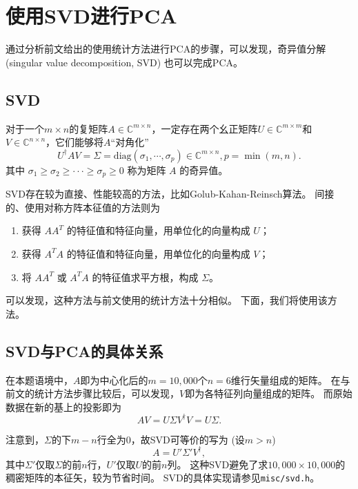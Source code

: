 \section{使用SVD进行PCA}
通过分析前文给出的使用统计方法进行PCA的步骤，可以发现，奇异值分解 (singular value decomposition, SVD) 也可以完成PCA。

\subsection{SVD}
对于一个$m \times n$的复矩阵$A \in \mathbb{C}^{m\times n}$，一定存在两个幺正矩阵$U \in \mathbb{C}^{m\times m}$和
$V \in \mathbb{C}^{n\times n}$，它们能够将$A$“对角化”
\begin{equation}
    U^\dagger AV = Σ = \mathrm{diag}(\sigma_1 ,\cdots,\sigma_p ) \in \mathbb{C}^{m\times n} , p = \min(m,n).
\end{equation}
其中 $\sigma_1 \ge \sigma_2 \ge ··· \ge \sigma_p \ge 0$ 称为矩阵 $A$ 的奇异值。

SVD存在较为直接、性能较高的方法，比如Golub-Kahan-Reinsch算法。
间接的、使用对称方阵本征值的方法则为
\begin{enumerate}
    \item 获得 $AA^T$ 的特征值和特征向量，用单位化的向量构成 $U$；
    \item 获得 $A^T A$ 的特征值和特征向量，用单位化的向量构成 $V$；
    \item 将 $AA^T$ 或 $A^T A$ 的特征值求平方根，构成 $\Sigma$。
\end{enumerate}
可以发现，这种方法与前文使用的统计方法十分相似。
下面，我们将使用该方法。

\subsection{SVD与PCA的具体关系}

在本题语境中，$A$即为中心化后的$m=10,000$个$n=6$维行矢量组成的矩阵。
在与前文的统计方法步骤比较后，可以发现，$V$即为各特征列向量组成的矩阵。
而原始数据在新的基上的投影即为
\begin{equation}
    AV = U\Sigma V^\dagger V = U\Sigma.
\end{equation}

注意到，$\Sigma$的下$m-n$行全为0，故SVD可等价的写为 (设$m>n$)
\begin{equation}
    A = U'\Sigma'V^\dagger,
\end{equation}
其中$\Sigma'$仅取$\Sigma$的前$n$行，$U'$仅取$U$的前$n$列。
这种SVD避免了求$10,000\times 10,000$的稠密矩阵的本征矢，较为节省时间。
SVD的具体实现请参见\verb|misc/svd.h|。

